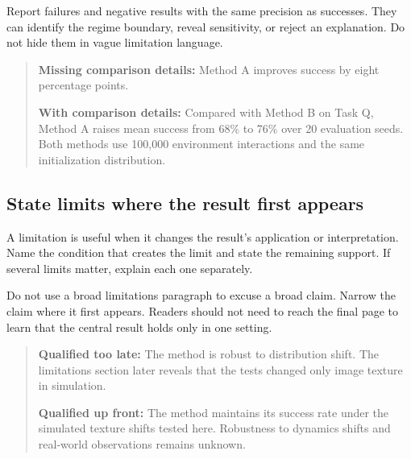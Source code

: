 Report failures and negative results with the same precision as successes.
They can identify the regime boundary, reveal sensitivity, or reject an
explanation. Do not hide them in vague limitation language.

\begin{quote}
\textbf{Missing comparison details:} Method A improves success by eight
percentage points.

\textbf{With comparison details:} Compared with Method B on Task Q, Method A raises
mean success from 68\% to 76\% over 20 evaluation seeds. Both methods use
100{,}000 environment interactions and the same initialization distribution.
\end{quote}

\subsection{State limits where the result first appears}

A limitation is useful when it changes the result's application or
interpretation. Name the condition that creates the limit and state the
remaining support. If several limits matter, explain each one separately.

Do not use a broad limitations paragraph to excuse a broad claim. Narrow the
claim where it first appears. Readers should not need to reach the final page
to learn that the central result holds only in one setting.

\begin{quote}
\textbf{Qualified too late:} The method is robust to distribution shift. The
limitations section later reveals that the tests changed only image texture
in simulation.

\textbf{Qualified up front:} The method maintains its success rate under the
simulated texture shifts tested here. Robustness to dynamics shifts and
real-world observations remains unknown.
\end{quote}
